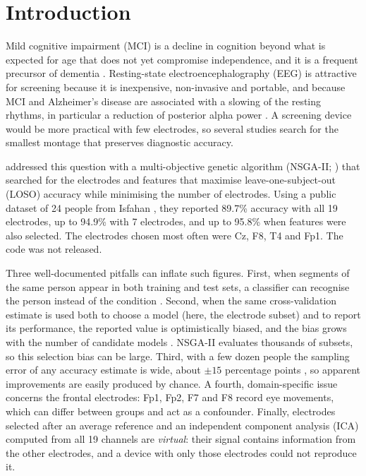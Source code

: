 \section{Introduction}

Mild cognitive impairment (MCI) is a decline in cognition beyond what is expected for age that does not yet compromise independence, and it is a frequent precursor of dementia \citep{petersen2004}. Resting-state electroencephalography (EEG) is attractive for screening because it is inexpensive, non-invasive and portable, and because MCI and Alzheimer's disease are associated with a slowing of the resting rhythms, in particular a reduction of posterior alpha power \citep{babiloni2015,cassani2018}. A screening device would be more practical with few electrodes, so several studies search for the smallest montage that preserves diagnostic accuracy.

\citet{aljalal2024} addressed this question with a multi-objective genetic algorithm (NSGA-II; \citealp{deb2002}) that searched for the electrodes and features that maximise leave-one-subject-out (LOSO) accuracy while minimising the number of electrodes. Using a public dataset of 24 people from Isfahan \citep{kashefpoor2016}, they reported 89.7\% accuracy with all 19 electrodes, up to 94.9\% with 7 electrodes, and up to 95.8\% when features were also selected. The electrodes chosen most often were Cz, F8, T4 and Fp1. The code was not released.

Three well-documented pitfalls can inflate such figures. First, when segments of the same person appear in both training and test sets, a classifier can recognise the person instead of the condition \citep{saeb2017}. Second, when the same cross-validation estimate is used both to choose a model (here, the electrode subset) and to report its performance, the reported value is optimistically biased, and the bias grows with the number of candidate models \citep{varma2006,cawley2010}. NSGA-II evaluates thousands of subsets, so this selection bias can be large. Third, with a few dozen people the sampling error of any accuracy estimate is wide, about $\pm 15$ percentage points \citep{varoquaux2018}, so apparent improvements are easily produced by chance. A fourth, domain-specific issue concerns the frontal electrodes: Fp1, Fp2, F7 and F8 record eye movements, which can differ between groups and act as a confounder. Finally, electrodes selected after an average reference and an independent component analysis (ICA) computed from all 19 channels are \emph{virtual}: their signal contains information from the other electrodes, and a device with only those electrodes could not reproduce it.


